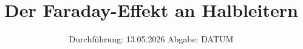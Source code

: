 

\subject{V46}
\title{Der Faraday-Effekt an Halbleitern}
\date{%
  Durchführung: 13.05.2026
  \hspace{3em}
  Abgabe: DATUM
}




\maketitle
\thispagestyle{empty}
\tableofcontents
\newpage








\printbibliography{}



